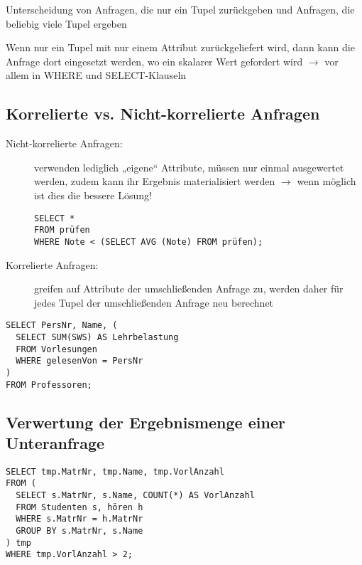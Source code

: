 \documentclass{lehramt-informatik-haupt}
\begin{document}
Unterscheidung von Anfragen, die nur ein Tupel zurückgeben und Anfragen,
die beliebig viele Tupel ergeben

Wenn nur ein Tupel mit nur einem Attribut zurückgeliefert wird, dann
kann die Anfrage dort eingesetzt werden, wo ein skalarer Wert gefordert
wird $\rightarrow$ vor allem in WHERE und SELECT-Klauseln

%

\subsection{Korrelierte vs. Nicht-korrelierte Anfragen}

\begin{description}
\item[Nicht-korrelierte Anfragen:]

verwenden lediglich „eigene“ Attribute, müssen nur einmal ausgewertet
werden, zudem kann ihr Ergebnis materialisiert werden $\rightarrow$ wenn
möglich ist dies die bessere Lösung!

\begin{verbatim}
SELECT *
FROM prüfen
WHERE Note < (SELECT AVG (Note) FROM prüfen);
\end{verbatim}

\item[Korrelierte Anfragen:]

greifen auf Attribute der umschließenden Anfrage zu, werden daher für
jedes Tupel der umschließenden Anfrage neu berechnet
\end{description}

\begin{verbatim}
SELECT PersNr, Name, (
  SELECT SUM(SWS) AS Lehrbelastung
  FROM Vorlesungen
  WHERE gelesenVon = PersNr
)
FROM Professoren;
\end{verbatim}

%

\subsection{Verwertung der Ergebnismenge einer Unteranfrage}

\begin{verbatim}
SELECT tmp.MatrNr, tmp.Name, tmp.VorlAnzahl
FROM (
  SELECT s.MatrNr, s.Name, COUNT(*) AS VorlAnzahl
  FROM Studenten s, hören h
  WHERE s.MatrNr = h.MatrNr
  GROUP BY s.MatrNr, s.Name
) tmp
WHERE tmp.VorlAnzahl > 2;
\end{verbatim}
\end{document}
